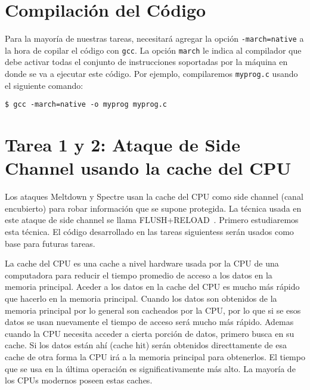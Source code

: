
\section{Compilación del Código}
\label{sidechannel:sec:compilation}

Para la mayoría de nuestras tareas, necesitará agregar la opción \texttt{-march=native} a la hora de copilar el código con \texttt{gcc}. La opción \texttt{march} le indica al compilador que debe activar todas el conjunto de  instrucciones soportadas por la máquina en donde se va a ejecutar este código.
Por ejemplo, compilaremos \texttt{myprog.c} usando el siguiente comando:

\begin{lstlisting}
$ gcc -march=native -o myprog myprog.c
\end{lstlisting}



\section{Tarea 1 y 2: Ataque de Side Channel usando la cache del CPU}

Los ataques Meltdown y Spectre usan la cache del CPU como side channel (canal encubierto) para robar información que se supone protegida. La técnica usada en este ataque de side channel se llama FLUSH+RELOAD~\cite{Yarom2014}. 
Primero estudiaremos esta técnica. El código desarrollado en las tareas siguientess serán usados como base para futuras tareas.

La cache del CPU es una cache a nivel hardware usada por la CPU de una computadora para reducir el tiempo promedio de acceso a los datos en la memoria principal. Aceder a los datos en la cache del CPU es mucho más rápido que hacerlo en la memoria principal. Cuando los datos son obtenidos de la memoria principal por lo general son cacheados por la CPU, por lo que si se esos datos se usan nuevamente el tiempo de acceso será mucho más rápido. Ademas cuando la CPU necesita acceder a cierta porción de datos, primero busca en su cache. Si los datos están ahí (cache hit) serán obtenidos directtamente de esa cache de otra forma la CPU irá a la memoria principal para obtenerlos. El tiempo que se usa en la última operación es significativamente más alto. La mayoría de los CPUs modernos poseen estas caches.


